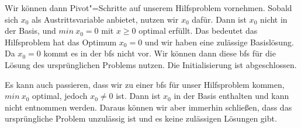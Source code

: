 Wir können dann Pivot"=Schritte auf unserem Hilfsproblem vornehmen. Sobald sich $x_0$ als Austrittsvariable anbietet, nutzen wir $x_0$ dafür. Dann ist $x_0$ nicht in der Basis, und $min~x_0=0$ mit $x \ge 0$ optimal erfüllt. Das bedeutet das Hilfsproblem hat das Optimum $x_0 = 0$ und wir haben eine zulässige Basislösung. Da $x_0 = 0$ kommt es in der bfs nicht vor. Wir können dann diese bfs für die Lösung des ursprünglichen Problems nutzen. Die Initialisierung ist abgeschlossen.

Es kann auch passieren, dass wir zu einer bfs für unser Hilfsproblem kommen, $min~x_0$ optimal, jedoch $x_0 \neq 0$ ist. Dann ist $x_0$ in der Basis enthalten und kann nicht entnommen werden. Daraus können wir aber immerhin schließen, dass das ursprüngliche Problem unzulässig ist und es keine zulässigen Lösungen gibt.

